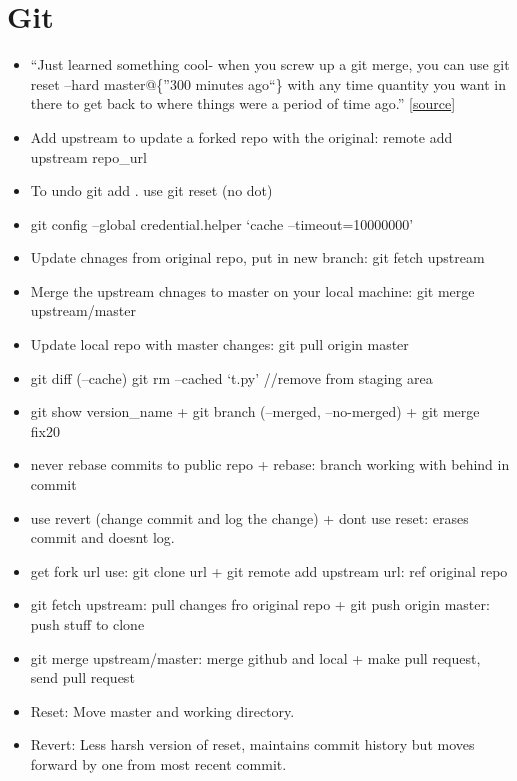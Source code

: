 \documentclass[]{book}
\theoremstyle{definition}
\theoremstyle{definition}
\theoremstyle{definition}
\theoremstyle{remark}
\begin{document}
\section{Git}\label{git}

\begin{itemize}
\item
  ``Just learned something cool- when you screw up a git merge, you can
  use git reset --hard master@\{''300 minutes ago``\} with any time
  quantity you want in there to get back to where things were a period
  of time ago.''
  \href{https://twitter.com/data_stephanie/status/968226587547258886}{{[}source{]}}
\item
  Add upstream to update a forked repo with the original: remote add
  upstream repo\_url
\item
  To undo git add . use git reset (no dot)
\item
  git config --global credential.helper `cache --timeout=10000000'
\item
  Update chnages from original repo, put in new branch: git fetch
  upstream
\item
  Merge the upstream chnages to master on your local machine: git merge
  upstream/master
\item
  Update local repo with master changes: git pull origin master
\item
  git diff (--cache) \textbar{} git rm --cached `t.py' //remove from
  staging area
\item
  git show version\_name + git branch (--merged, --no-merged) + git
  merge fix20
\item
  never rebase commits to public repo + rebase: branch working with
  behind in commit
\item
  use revert (change commit and log the change) + dont use reset: erases
  commit and doesnt log.
\item
  get fork url use: git clone url + git remote add upstream url: ref
  original repo
\item
  git fetch upstream: pull changes fro original repo + git push origin
  master: push stuff to clone
\item
  git merge upstream/master: merge github and local + make pull request,
  send pull request
\item
  Reset: Move master and working directory.
\item
  Revert: Less harsh version of reset, maintains commit history but
  moves forward by one from most recent commit.
\end{itemize}
\end{document}
